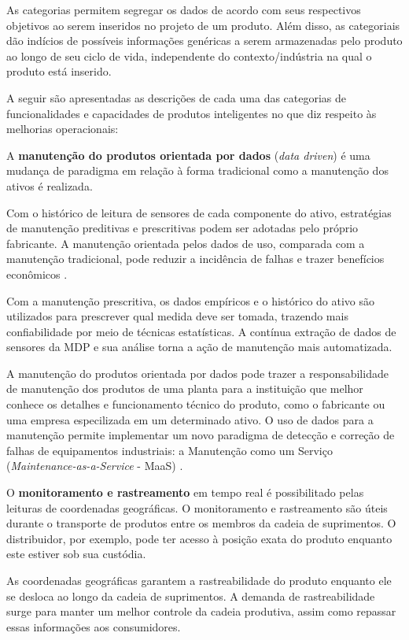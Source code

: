 As categorias permitem segregar os dados de acordo com seus respectivos objetivos ao serem inseridos no projeto de um produto. Além disso, as categoriais dão indícios de possíveis informações genéricas a serem armazenadas pelo produto ao longo de seu ciclo de vida, independente do contexto/indústria na qual o produto está inserido.

A seguir são apresentadas as descrições de cada uma das categorias de funcionalidades e capacidades de produtos inteligentes no que diz respeito às melhorias operacionais:

A \textbf{manutenção do produtos orientada por dados} (\textit{data driven})  é uma mudança de paradigma em relação à forma tradicional como a manutenção dos ativos é realizada.

Com o histórico de leitura de sensores de cada componente do ativo, estratégias de manutenção preditivas e prescritivas podem ser adotadas pelo próprio fabricante. A manutenção orientada pelos dados de uso, comparada com a manutenção tradicional, pode reduzir a incidência de falhas e trazer benefícios econômicos \cite{odonovan2015maintenance}.

Com a manutenção prescritiva, os dados empíricos e o histórico do ativo são utilizados para prescrever qual medida deve ser tomada, trazendo mais confiabilidade por meio de técnicas estatísticas. A contínua extração de dados de sensores da MDP e sua análise torna a ação de manutenção mais automatizada.

A manutenção do produtos orientada por dados pode trazer a responsabilidade de manutenção dos produtos de uma planta para a instituição que melhor conhece os detalhes e funcionamento técnico do produto, como o fabricante ou uma empresa especilizada em um determinado ativo. O uso de dados para a manutenção permite implementar um novo paradigma de detecção e correção de falhas de equipamentos industriais: a Manutenção como um Serviço (\textit{Maintenance-as-a-Service} - MaaS)  \cite{zoll2018maas}.

O \textbf{monitoramento e rastreamento} em tempo real é possibilitado pelas leituras de coordenadas geográficas. O monitoramento e rastreamento são úteis durante o transporte de produtos entre os membros da cadeia de suprimentos. O distribuidor, por exemplo, pode ter acesso à posição exata do produto enquanto este estiver sob sua custódia.

As coordenadas geográficas garantem a rastreabilidade do produto enquanto ele se desloca ao longo da cadeia de suprimentos. A demanda de rastreabilidade surge para manter um melhor controle da cadeia produtiva, assim como repassar essas informações aos consumidores.

